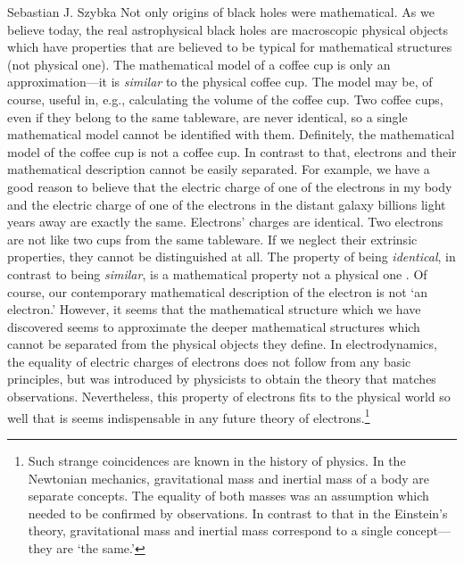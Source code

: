 \begin{artengenv}{Sebastian J. Szybka}
Not only origins of black holes were mathematical. As we believe today, the real astrophysical black holes are macroscopic physical objects which have properties that are believed to be typical for mathematical structures (not physical one). The mathematical model of a coffee cup is only an approximation---it is \textit{similar} to the physical coffee cup. The model may be, of course, useful in, e.g., calculating the volume of the coffee cup. Two coffee cups, even if they belong to the same tableware, are never identical, so a single mathematical model cannot be identified with them. Definitely, the mathematical model of the coffee cup is not a coffee cup. In contrast to that, electrons and their mathematical description cannot be easily separated. For example, we have a good reason to believe that the electric charge of one of the electrons in my body and the electric charge of one of the electrons in the distant galaxy billions light years away are exactly the same. Electrons' charges are identical. Two electrons are not like two cups from the same tableware. If we neglect their extrinsic properties, they cannot be distinguished at all.  The property of being \textit{identical}, in contrast to being \textit{similar}, is a mathematical property not a physical one \parencite{staruszkiewicz_filozofia_2001}. Of course, our contemporary mathematical description of the electron is not `an electron.' However, it seems that the mathematical structure which we have discovered seems to approximate the deeper mathematical structures which cannot be separated from the physical objects they define. In electrodynamics, the equality of electric charges of electrons does not follow from any basic principles, but was introduced by physicists to obtain the theory that matches observations. Nevertheless, this property of electrons fits to the physical world so well that is seems indispensable in any future theory of electrons.\footnote{Such strange coincidences are known in the history of physics. In the Newtonian mechanics, gravitational mass and inertial mass of a body are separate concepts. The equality of both masses was an assumption which needed to be confirmed by observations. In contrast to that in the Einstein's theory, gravitational mass and inertial mass correspond to a single concept---they are `the same.'}


\end{artengenv}
